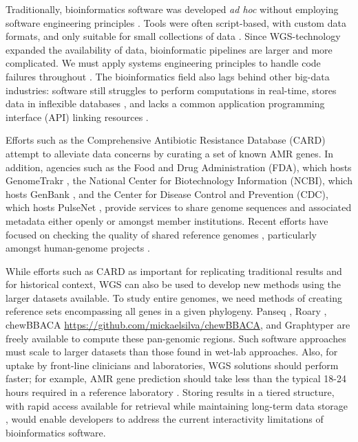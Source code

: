 \documentclass[a4,center,fleqn]{NAR}
\begin{document}
Traditionally, bioinformatics software was developed \textit{ad hoc} without employing software engineering principles \cite{de2015trends}.
Tools were often script-based, with custom data formats, and only suitable for small collections of data \cite{de2015trends}.
Since WGS-technology expanded the availability of data, bioinformatic pipelines are larger and more complicated.
We must apply systems engineering principles to handle code failures throughout \cite{schatz2015biological}.
The bioinformatics field also lags behind other big-data industries: software still struggles to perform computations in real-time, stores data in inflexible databases \cite{de2015trends}, and lacks a common application programming interface (API) linking resources \cite{swaminathan2016review}.

Efforts such as the Comprehensive Antibiotic Resistance Database (CARD) \cite{mcarthur2013comprehensive} attempt to alleviate data concerns by curating a set of known AMR genes.
In addition, agencies such as the Food and Drug Administration (FDA), which hosts GenomeTrakr \cite{allard2016practical}, the National Center for Biotechnology Information (NCBI), which hosts GenBank \cite{doi:10.1093/nar/gks1195}, and the Center for Disease Control and Prevention (CDC), which hosts PulseNet \cite{swaminathan2001pulsenet}, provide services to share genome sequences and associated metadata either openly or amongst member institutions.
Recent efforts have focused on checking the quality of shared reference genomes \cite{parks2015checkm}, particularly amongst human-genome projects \cite{lee2017ngscheckmate}.

While efforts such as CARD as important for replicating traditional results and for historical context, WGS can also be used to develop new methods using the larger datasets available.
To study entire genomes, we need methods of creating reference sets encompassing all genes in a given phylogeny.
Panseq \cite{laing2010pan}, Roary \cite{page2015roary}, chewBBACA \url{https://github.com/mickaelsilva/chewBBACA}, and Graphtyper \cite{Eggertsson148403} are freely available to compute these pan-genomic regions.
Such software approaches must scale to larger datasets than those found in wet-lab approaches.
Also, for uptake by front-line clinicians and laboratories, WGS solutions should perform faster; for example, AMR gene prediction should take less than the typical 18-24 hours required in a reference laboratory \cite{koser2012routine}.
Storing results in a tiered structure, with rapid access available for retrieval while maintaining long-term data storage \cite{schatz2015biological}, would enable developers to address the current interactivity limitations \cite{de2015trends} of bioinformatics software.
\end{document}
